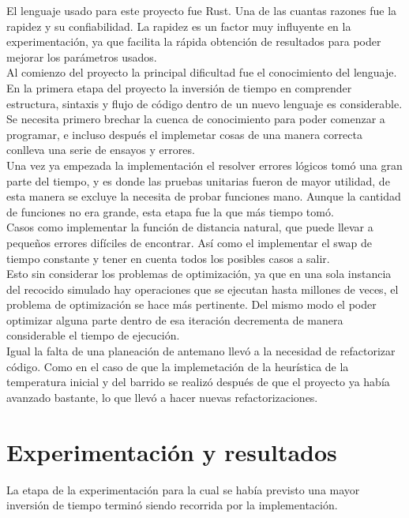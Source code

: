\documentclass[a4paper]{article}
\begin{document}
El lenguaje usado para este proyecto fue Rust. Una de las cuantas razones fue la rapidez y su confiabilidad. La rapidez es un factor muy influyente en la experimentaci\'on, ya que facilita la r\'apida obtenci\'on de resultados para poder mejorar los par\'ametros usados.\\

Al comienzo del proyecto la principal dificultad fue el conocimiento del lenguaje. En la primera etapa del proyecto la inversi\'on de tiempo en comprender estructura, sintaxis y flujo de c\'odigo dentro de un nuevo lenguaje es considerable. Se necesita primero brechar la cuenca de conocimiento para poder comenzar a programar, e incluso despu\'es el implemetar cosas de una manera correcta conlleva una serie de ensayos y errores. \\

Una vez ya empezada la implementaci\'on el resolver errores l\'ogicos tom\'o una gran parte del tiempo, y es donde las pruebas unitarias fueron de mayor utilidad, de esta manera se excluye la necesita de probar funciones  mano. Aunque la cantidad de funciones no era grande, esta etapa fue la que m\'as tiempo tom\'o.\\

Casos como implementar la funci\'on de distancia natural, que puede llevar a pequeños errores difíciles de encontrar. Así como el implementar el swap de tiempo constante y tener en cuenta todos los posibles casos a salir.\\

Esto sin considerar los problemas de optimizaci\'on, ya que en una sola instancia del recocido simulado hay operaciones que se ejecutan hasta millones de veces, el problema de optimizaci\'on se hace m\'as pertinente. Del mismo modo el poder optimizar alguna parte dentro de esa iteraci\'on decrementa de manera considerable el tiempo de ejecuci\'on.\\

Igual la falta  de una planeaci\'on de antemano llev\'o a la necesidad de refactorizar c\'odigo. Como en el caso de que la implemetaci\'on de la heur\'istica de la temperatura inicial y del barrido se realiz\'o despu\'es de que el proyecto ya hab\'ia avanzado bastante, lo que llev\'o a hacer nuevas refactorizaciones.\\




\section*{Experimentaci\'on y resultados}
La etapa de la experimentaci\'on para la cual se hab\'ia previsto una mayor inversi\'on de tiempo termin\'o siendo recorrida por la implementaci\'on.\\
\end{document}
